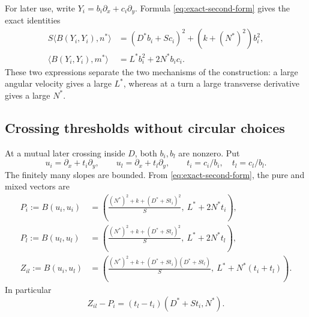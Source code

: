 For later use, write $Y_i=b_i\partial_x+c_i\partial_y$.  Formula
\eqref{eq:exact-second-form} gives the exact identities
\begin{equation}
 \begin{aligned}
 S\langle B(Y_i,Y_i),n^*\rangle
    &=(D^*b_i+Sc_i)^2+(k+(N^*)^2)b_i^2,\\
 \langle B(Y_i,Y_i),m^*\rangle
    &=L^*b_i^2+2N^*b_ic_i.
 \end{aligned}
 \label{eq:pure-direction-components}
\end{equation}
These two expressions separate the two mechanisms of the construction:
a large angular velocity gives a large $L^*$, whereas at a turn a large
transverse derivative gives a large $N^*$.

\subsection{Crossing thresholds without circular choices}

At a mutual later crossing inside $D$, both $b_i,b_l$ are nonzero.
Put
\[
 u_i=\partial_x+t_i\partial_y,\qquad
 u_l=\partial_x+t_l\partial_y,
 \qquad t_i=c_i/b_i,\quad t_l=c_l/b_l.
\]
The finitely many slopes are bounded.  From
\eqref{eq:exact-second-form}, the pure and mixed vectors are
\begin{equation}
 \begin{aligned}
 P_i:=B(u_i,u_i)
   &=\left(\frac{(N^*)^2+k+(D^*+St_i)^2}{S},\ L^*+2N^*t_i\right),\\
 P_l:=B(u_l,u_l)
   &=\left(\frac{(N^*)^2+k+(D^*+St_l)^2}{S},\ L^*+2N^*t_l\right),\\
 Z_{il}:=B(u_i,u_l)
   &=\left(\frac{(N^*)^2+k+(D^*+St_i)(D^*+St_l)}{S},\
             L^*+N^*(t_i+t_l)\right).
 \end{aligned}
 \label{eq:crossing-components}
\end{equation}
In particular
\begin{equation}
 Z_{il}-P_i=(t_l-t_i)(D^*+St_i,N^*).
 \label{eq:mixed-pure-difference}
\end{equation}

